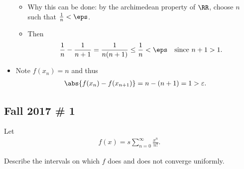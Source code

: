 \begin{solution}
\begin{itemize}
  \begin{itemize}
  \tightlist
  \item
    Why this can be done: by the archimedean property of \(\RR\), choose
    \(n\) such that \({1\over n} < \eps\).
  \item
    Then
    \begin{align*}
    {1 \over n} - {1\over n+1} = {1 \over n(n+1)} \leq {1\over n} < \eps \quad\text{since }n+1 > 1
    .\end{align*}
  \end{itemize}
\item
  Note \(f(x_n) = n\) and thus
  \begin{align*}\abs{f(x_n) - f(x_{n+1})} = n - (n+1) = 1 > \varepsilon.\end{align*}
\end{itemize}

\end{solution}

\hypertarget{fall-2017-1}{%
\subsection{Fall 2017 \# 1}\label{fall-2017-1}}

Let
\begin{align*}
f(x) = s \sum _{n=0}^{\infty} \frac{x^{n}}{n !}.
\end{align*}

Describe the intervals on which \(f\) does and does not converge
uniformly.


